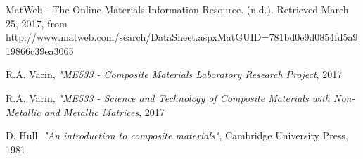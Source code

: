 \documentclass[11pt]{article}
\begin{document}
\newpage
\begin{thebibliography}{9}

MatWeb - The Online Materials Information Resource. (n.d.). Retrieved March 25, 2017, from http://www.matweb.com/search/DataSheet.aspxMatGUID=781bd0e9d0854fd5a919866c39ea3065

R.A. Varin, \textit{"ME533 - Composite Materials Laboratory Research Project}, 2017

R.A. Varin, \textit{"ME533 - Science and Technology of Composite Materials with Non-Metallic and Metallic Matrices}, 2017

D. Hull, \textit{"An introduction to composite materials"}, Cambridge University Press, 1981

\end{thebibliography}
\end{document}
